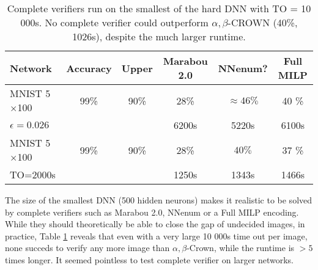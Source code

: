 \begin{table}[b!]
	\centering
	\begin{tabular}{||l|c|c||c|c|c||}
		\hline
		Network &  Accuracy & Upper  & Marabou 2.0 & NNenum? &  Full MILP  \\ \hline
		MNIST 5$\times$100 & 99\% & 90\% & 28\% & $\approx 46\%$ & 40 \%    \\
		$\epsilon = 0.026$ & &  &6200s &  5220s & 6100s
		  \\  \hline
		  MNIST 5$\times$100 & 99\% & 90\% & 28\% & $40\%$ & 37 \%    \\
		  TO=2000s & &  & 1250s  & 1343s & 1466s \\  \hline	
	\end{tabular}
\caption{Complete verifiers run on the smallest of the hard DNN with TO = 10 000s. 
No complete verifier could outperform $\alpha,\beta$-CROWN (40\%, 1026s), despite the much larger runtime.}
\label{table_complete}
\end{table}



The size of the smallest DNN (500 hidden neurons) makes it realistic to be solved by complete verifiers such as Marabou 2.0, NNenum or a Full MILP encoding. 
While they should theoretically be able to close the gap of undecided images,
in practice, Table \ref{table_complete} reveals that even with a very large 10 000s time out per image, none succeds to verify any more image than $\alpha,\beta$-Crown, while the runtime is $>5$ times longer. It seemed pointless to test complete verifier on larger networks.









